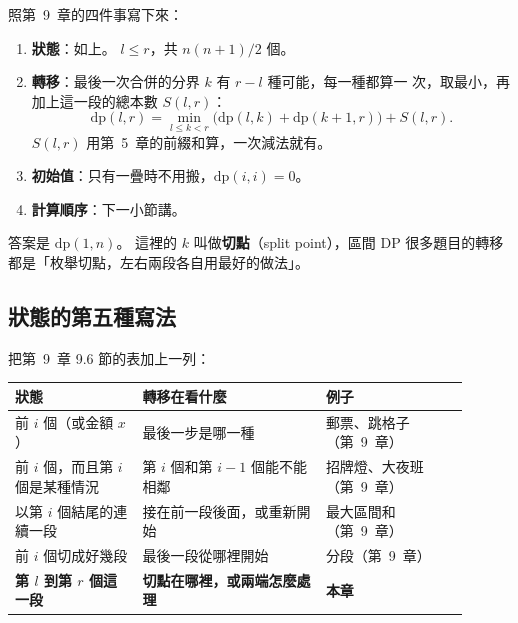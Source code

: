 \begin{center}
\end{center}

照第~9~章的四件事寫下來：

\begin{enumerate}
\item \textbf{狀態}：如上。 $l \le r$，共 $n(n + 1)/2$ 個。
\item \textbf{轉移}：最後一次合併的分界 $k$ 有 $r - l$ 種可能，每一種都算一
次，取最小，再加上這一段的總本數 $S(l, r)$：
\[
\mathrm{dp}(l, r) = \min_{l \le k < r} \bigl(\mathrm{dp}(l, k) + \mathrm{dp}(k + 1, r)\bigr) + S(l, r).
\]
$S(l, r)$ 用第~5~章的前綴和算，一次減法就有。
\item \textbf{初始值}：只有一疊時不用搬，$\mathrm{dp}(i, i) = 0$。
\item \textbf{計算順序}：下一小節講。
\end{enumerate}

答案是 $\mathrm{dp}(1, n)$。 這裡的 $k$ 叫做\textbf{切點}（split point），區間
DP 很多題目的轉移都是「枚舉切點，左右兩段各自用最好的做法」。

\subsection{狀態的第五種寫法}
\label{sec:ivdp-shapes}

把第~9~章 9.6 節的表加上一列：

\begin{center}
\begin{tabular}{p{0.25\linewidth}p{0.36\linewidth}p{0.29\linewidth}}
\toprule
狀態 & 轉移在看什麼 & 例子 \\
\midrule
前 $i$ 個（或金額 $x$） & 最後一步是哪一種 & 郵票、跳格子（第~9~章） \\
前 $i$ 個，而且第 $i$ 個是某種情況 & 第 $i$ 個和第 $i - 1$ 個能不能相鄰 & 招牌燈、大夜班（第~9~章） \\
以第 $i$ 個結尾的連續一段 & 接在前一段後面，或重新開始 & 最大區間和（第~9~章） \\
前 $i$ 個切成好幾段 & 最後一段從哪裡開始 & 分段（第~9~章） \\
\textbf{第 $l$ 到第 $r$ 個這一段} & \textbf{切點在哪裡，或兩端怎麼處理} & \textbf{本章} \\
\bottomrule
\end{tabular}
\end{center}

